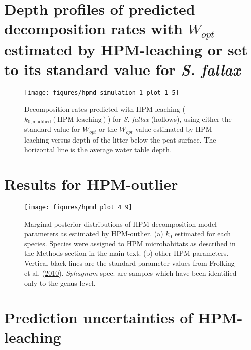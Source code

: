 \documentclass[
  12pt,
]{article}
\begin{document}
\hypertarget{sup-9}{%
\section{\texorpdfstring{Depth profiles of predicted decomposition rates with \(W_{opt}\) estimated by HPM-leaching or set to its standard value for \emph{S. fallax}}{Depth profiles of predicted decomposition rates with W\_\{opt\} estimated by HPM-leaching or set to its standard value for S. fallax}}\label{sup-9}}



\begin{figure}[H]

{\centering \texttt{[image: figures/hpmd\_simulation\_1\_plot\_1\_5]} 

}

\caption{Decomposition rates predicted with HPM-leaching (\(k_{0,\text{modified}}(\text{HPM-leaching})\)) for \emph{S. fallax} (hollows), using either the standard value for \(W_{opt}\) or the \(W_{opt}\) value estimated by HPM-leaching versus depth of the litter below the peat surface. The horizontal line is the average water table depth.}\label{fig:sup-hpmd-simulation-1-plot-5}
\end{figure}

\hypertarget{sup-10}{%
\section{Results for HPM-outlier}\label{sup-10}}



\begin{figure}[H]

{\centering \texttt{[image: figures/hpmd\_plot\_4\_9]} 

}

\caption{Marginal posterior distributions of HPM decomposition model parameters as estimated by HPM-outlier. (a) \(k_0\) estimated for each species. Species were assigned to HPM microhabitats as described in the Methods section in the main text. (b) other HPM parameters. Vertical black lines are the standard parameter values from Frolking et al. (\protect\hyperlink{ref-Frolking.2010}{2010}). \emph{Sphagnum} spec. are samples which have been identified only to the genus level.}\label{fig:sup-hpmd-plot-4-9}
\end{figure}

\hypertarget{sup-11}{%
\section{Prediction uncertainties of HPM-leaching}\label{sup-11}}
\end{document}
